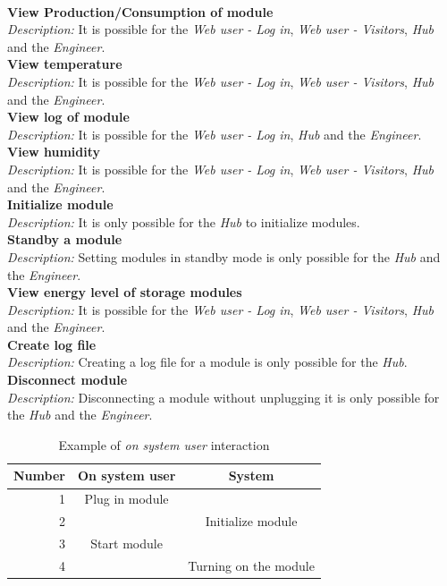 		\\\textbf{View Production/Consumption of module}
		\\\textit{Description: }
		It is possible for the \textit{Web user - Log in}, \textit{Web user - Visitors}, \textit{Hub} and the \textit{Engineer}.
		\\\textbf{View temperature}
		\\\textit{Description: }
		It is possible for the \textit{Web user - Log in}, \textit{Web user - Visitors}, \textit{Hub} and the \textit{Engineer}.
		\\\textbf{View log of module}
		\\\textit{Description: }
		It is possible for the \textit{Web user - Log in}, \textit{Hub} and the \textit{Engineer}.
		\\\textbf{View humidity}
		\\\textit{Description: }
		It is possible for the \textit{Web user - Log in}, \textit{Web user - Visitors}, \textit{Hub} and the \textit{Engineer}.
		\\\textbf{Initialize module}
		\\\textit{Description: }
		It is only possible for the \textit{Hub} to initialize modules.
		\\\textbf{Standby a module}
		\\\textit{Description: }
		Setting modules in standby mode is only possible for the \textit{Hub} and the \textit{Engineer}.
		\\\textbf{View energy level of storage modules}
		\\\textit{Description: }
		It is possible for the \textit{Web user - Log in}, \textit{Web user - Visitors}, \textit{Hub} and the \textit{Engineer}.
		\\\textbf{Create log file}
		\\\textit{Description: }
		Creating a log file for a module is only possible for the \textit{Hub}.
		\\\textbf{Disconnect module}
		\\\textit{Description: }
		Disconnecting a module without unplugging it is only possible for the \textit{Hub} and the \textit{Engineer}.
		\\\begin{table}[h!]
					\begin{tabular}{| r | c | c |}
					\hline
					Number	& On system user	& System \\ \hline
					1		& Plug in module	& ~ \\ \hline
					2		& ~					& Initialize module \\ \hline
					3		& Start module		& ~ \\ \hline
					4		& ~					& Turning on the module \\ \hline
					\end{tabular}
					\caption{Example of \textit{on system user} interaction}
				\end{table}

